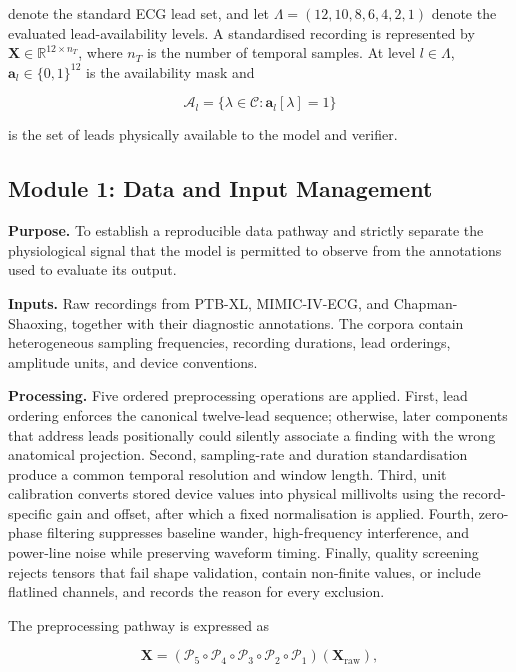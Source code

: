 \documentclass{ssnreview}
\begin{document}
denote the standard ECG lead set, and let
$\Lambda=(12,10,8,6,4,2,1)$ denote the evaluated lead-availability levels. A
standardised recording is represented by
$\mathbf{X}\in\mathbb{R}^{12\times n_T}$, where $n_T$ is the number of temporal
samples. At level $l\in\Lambda$, $\mathbf{a}_l\in\{0,1\}^{12}$ is the availability
mask and

\begin{equation}
  \mathcal{A}_l=\{\lambda\in\mathcal{C}:\mathbf{a}_l[\lambda]=1\}
\end{equation}

is the set of leads physically available to the model and verifier.

\subsection{Module 1: Data and Input Management}

\textbf{Purpose.} To establish a reproducible data pathway and strictly separate the
physiological signal that the model is permitted to observe from the annotations used to
evaluate its output.

\textbf{Inputs.} Raw recordings from PTB-XL, MIMIC-IV-ECG, and
Chapman-Shaoxing, together with their diagnostic annotations. The corpora contain
heterogeneous sampling frequencies, recording durations, lead orderings, amplitude units,
and device conventions.

\textbf{Processing.} Five ordered preprocessing operations are applied. First, lead
ordering enforces the canonical twelve-lead sequence; otherwise, later components that
address leads positionally could silently associate a finding with the wrong anatomical
projection. Second, sampling-rate and duration standardisation produce a common temporal
resolution and window length. Third, unit calibration converts stored device values into
physical millivolts using the record-specific gain and offset, after which a fixed
normalisation is applied. Fourth, zero-phase filtering suppresses baseline wander,
high-frequency interference, and power-line noise while preserving waveform timing.
Finally, quality screening rejects tensors that fail shape validation, contain non-finite
values, or include flatlined channels, and records the reason for every exclusion.

The preprocessing pathway is expressed as

\begin{equation}
  \mathbf{X}
  =(\mathcal{P}_5\circ\mathcal{P}_4\circ\mathcal{P}_3
  \circ\mathcal{P}_2\circ\mathcal{P}_1)(\mathbf{X}_{\mathrm{raw}}),
  \label{eq:preprocessing}
\end{equation}
\end{document}
